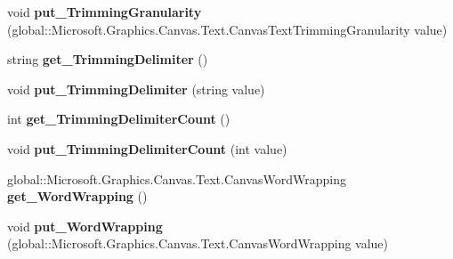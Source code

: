\begin{DoxyCompactItemize}
void {\bfseries put\+\_\+\+Trimming\+Granularity} (global\+::\+Microsoft.\+Graphics.\+Canvas.\+Text.\+Canvas\+Text\+Trimming\+Granularity value)
\item 
\mbox{\label{class_microsoft_1_1_graphics_1_1_canvas_1_1_text_1_1_canvas_text_format_a51c4ffa1642d76d5d0490e546132ec41}} 
string {\bfseries get\+\_\+\+Trimming\+Delimiter} ()
\item 
\mbox{\label{class_microsoft_1_1_graphics_1_1_canvas_1_1_text_1_1_canvas_text_format_af89475ea2460707e1f04259bf78eb72f}} 
void {\bfseries put\+\_\+\+Trimming\+Delimiter} (string value)
\item 
\mbox{\label{class_microsoft_1_1_graphics_1_1_canvas_1_1_text_1_1_canvas_text_format_ac993bc984dcc620772bc989f6cc7ab97}} 
int {\bfseries get\+\_\+\+Trimming\+Delimiter\+Count} ()
\item 
\mbox{\label{class_microsoft_1_1_graphics_1_1_canvas_1_1_text_1_1_canvas_text_format_a5b0a73ce4c824439d5e199f8b61aa1ea}} 
void {\bfseries put\+\_\+\+Trimming\+Delimiter\+Count} (int value)
\item 
\mbox{\label{class_microsoft_1_1_graphics_1_1_canvas_1_1_text_1_1_canvas_text_format_abb2706795b70c24892b6368e51d9920d}} 
global\+::\+Microsoft.\+Graphics.\+Canvas.\+Text.\+Canvas\+Word\+Wrapping {\bfseries get\+\_\+\+Word\+Wrapping} ()
\item 
\mbox{\label{class_microsoft_1_1_graphics_1_1_canvas_1_1_text_1_1_canvas_text_format_a0ca952d56c80bf6bcf1f90158f9900be}} 
void {\bfseries put\+\_\+\+Word\+Wrapping} (global\+::\+Microsoft.\+Graphics.\+Canvas.\+Text.\+Canvas\+Word\+Wrapping value)
\item 
\mbox{\label{class_microsoft_1_1_graphics_1_1_canvas_1_1_text_1_1_canvas_text_format_af5d308c3a1f87b675c1b52eff7c0148c}} 

\end{DoxyCompactItemize}
